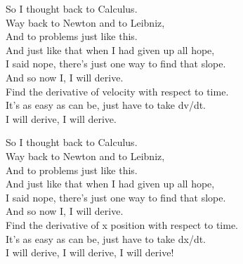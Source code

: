 \vspace{10pt}
So I thought back to Calculus.\\
Way back to Newton and to Leibniz,\\
And to problems just like this.\\
And just like that when I had given up all hope,\\
I said nope, there's just one way to find that slope.\\
And so now I, I will derive.\\
Find the derivative of velocity with respect to time.\\
It's as easy as can be, just have to take dv/dt.\\
I will derive, I will derive.\par
\vspace{10pt}
So I thought back to Calculus.\\
Way back to Newton and to Leibniz,\\
And to problems just like this.\\
And just like that when I had given up all hope,\\
I said nope, there's just one way to find that slope.\\
And so now I, I will derive.\\
Find the derivative of x position with respect to time.\\
It's as easy as can be, just have to take dx/dt.\\
I will derive, I will derive, I will derive!
